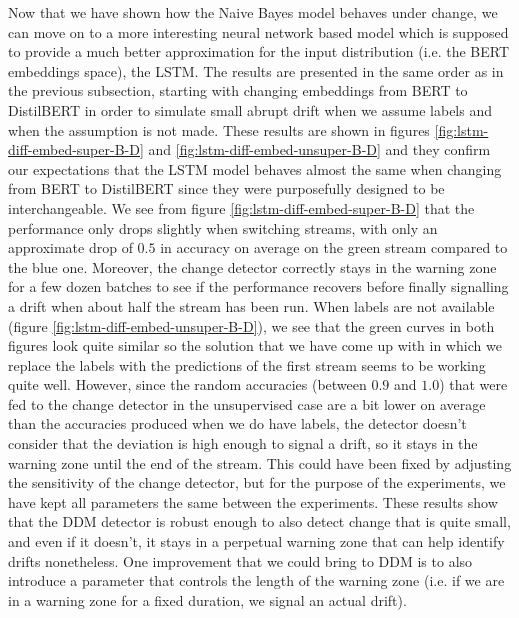 \documentclass[12pt]{extreport}
\begin{document}
Now that we have shown how the Naive Bayes model behaves under change, we can move on to a more interesting neural network based model which is supposed to provide a much better approximation for the input distribution (i.e. the BERT embeddings space), the LSTM. The results are presented in the same order as in the previous subsection, starting with changing embeddings from BERT to DistilBERT in order to simulate small abrupt drift when we assume labels and when the assumption is not made. These results are shown in figures \ref{fig:lstm-diff-embed-super-B-D} and \ref{fig:lstm-diff-embed-unsuper-B-D} and they confirm our expectations that the LSTM model behaves almost the same when changing from BERT to DistilBERT since they were purposefully designed to be interchangeable. We see from figure \ref{fig:lstm-diff-embed-super-B-D} that the performance only drops slightly when switching streams, with only an approximate drop of $0.5$ in accuracy on average on the green stream compared to the blue one. Moreover, the change detector correctly stays in the warning zone for a few dozen batches to see if the performance recovers before finally signalling a drift when about half the stream has been run. When labels are not available (figure \ref{fig:lstm-diff-embed-unsuper-B-D}), we see that the green curves in both figures look quite similar so the solution that we have come up with in which we replace the labels with the predictions of the first stream seems to be working quite well. However, since the random accuracies (between $0.9$ and $1.0$) that were fed to the change detector in the unsupervised case are a bit lower on average than the accuracies produced when we do have labels, the detector doesn't consider that the deviation is high enough to signal a drift, so it stays in the warning zone until the end of the stream. This could have been fixed by adjusting the sensitivity of the change detector, but for the purpose of the experiments, we have kept all parameters the same between the experiments. These results show that the DDM detector is robust enough to also detect change that is quite small, and even if it doesn't, it stays in a perpetual warning zone that can help identify drifts nonetheless. One improvement that we could bring to DDM is to also introduce a parameter that controls the length of the warning zone (i.e. if we are in a warning zone for a fixed duration, we signal an actual drift).
\end{document}

